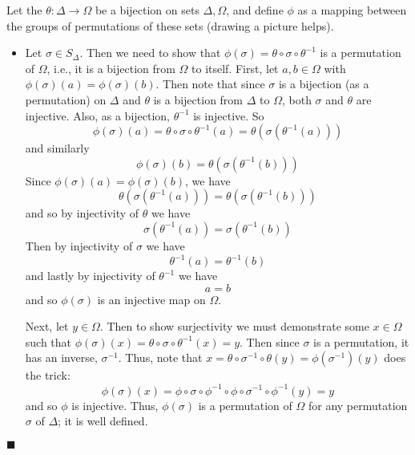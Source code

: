\documentclass[12pt]{article}
\renewcommand{\qed}{\hfill$\blacksquare$}
\renewenvironment{proof}{\begin{addmargin}[1em]{0em}\begin{newproof}}{\end{newproof}\end{addmargin}\qed}
\begin{document}
\begin{proof}
Let the $\theta: \Delta \rightarrow \Omega$ be a bijection on sets $ \Delta ,\Omega $, and define $\phi$ as a mapping between the groups of permutations of these sets (drawing a picture helps).

\begin{itemize}
    \item Let $\sigma \in S_{\Delta}$. Then we need to show that $\phi\left(\sigma\right) = \theta \circ \sigma \circ \theta^{-1}$ is a permutation of $\Omega$, i.e., it is a bijection from $\Omega $ to itself. First, let $a,b\in \Omega$ with $\phi\left(\sigma\right)\left(a\right)=\phi\left(\sigma\right)\left(b\right)$.  Then note that since $\sigma$ is a bijection (as a permutation) on $\Delta$ and $\theta$ is a bijection from $\Delta$ to $\Omega$, both $\sigma$ and $\theta$ are injective. Also, as a bijection, $\theta^{-1}$ is injective. So
    $$ \phi\left(\sigma\right)\left(a\right)  = \theta \circ \sigma \circ \theta^{-1} \left(a\right) = \theta\left(\sigma\left(\theta^{-1}\left(a\right)\right)\right) $$ and similarly
    $$ \phi\left(\sigma\right)\left(b\right) = \theta\left(\sigma\left(\theta^{-1}\left(b\right)\right)\right) $$ Since $\phi\left(\sigma\right)\left(a\right)=\phi\left(\sigma\right)\left(b\right)$, we have $$ \theta\left(\sigma\left(\theta^{-1}\left(a\right)\right)\right) = \theta\left(\sigma\left(\theta^{-1}\left(b\right)\right)\right) $$ and so by injectivity of $\theta$ we have
    $$ \sigma\left(\theta^{-1}\left(a\right)\right) = \sigma \left(\theta^{-1}\left(b\right)\right) $$ Then by injectivity of $\sigma$ we have
    $$ \theta^{-1}\left(a\right) = \theta^{-1}\left(b\right) $$ and lastly by injectivity of $\theta^{-1}$ we have
    $$ a = b $$ and so $\phi\left(\sigma\right)$ is an injective map on $\Omega$.

    Next, let $y\in \Omega$. Then to show surjectivity we must demonstrate some $x\in \Omega$ such that $\phi\left(\sigma\right)\left(x\right) = \theta \circ \sigma \circ \theta ^{-1} \left(x\right)=y$. Then since $\sigma$ is a permutation, it has an inverse, $\sigma^{-1}$. Thus, note that $x=\theta \circ \sigma^{-1}\circ \theta \left(y\right) = \phi\left(\sigma^{-1}\right)\left(y\right)$ does the trick:
    $$ \phi\left(\sigma\right)\left(x\right) = \phi \circ \sigma \circ \phi^{-1} \circ \phi \circ \sigma^{-1} \circ \phi^{-1}\left(y\right) = y $$ and so $\phi$ is injective. Thus, $\phi\left(\sigma\right)$ is a permutation of $\Omega$ for any permutation $\sigma$ of $\Delta$; it is well defined.


\end{itemize}
\end{proof}
\end{document}
